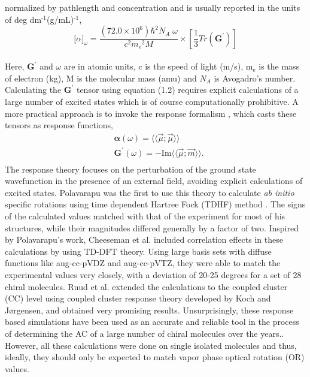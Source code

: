 normalized by pathlength and concentration and is usually reported in the units of deg dm$^{\text{-1}}$(g/mL)$^{\text{-1}}$,\cite{Crawford06}
\\
\begin{equation}
{\lbrack\alpha\rbrack}_{\omega} = \frac{(72.0 \times 10^6){\hbar}^2 N_A\;\omega}{c^2{m_e}^2 M} \times \left[ \frac{1}{3}Tr(\textbf{G}^\prime)\right]
\end{equation}
\\
Here, $\textbf{G}^\prime$ and $\omega$ are in atomic units, c is the speed of light (m/s), m$_{\text{e}}$ is the 
mass of electron (kg), M is the molecular mass (amu) and $N_A$ is Avogadro's number. Calculating the 
$\textbf{G}^\prime$ tensor using equation (1.2) requires explicit calculations of a large number of 
excited states which is of course computationally prohibitive. A more practical approach is to invoke the response formalism
\cite{Koch90,Kobayashi94}, which casts these tensors as response functions,
\begin{equation}
\begin{split}
&\bm{\alpha}(\omega) = \langle\langle\vec{\mu};\vec{\mu}\rangle\rangle\\
&\textbf{G}^{\prime}(\omega) = -\text{Im}\langle\langle\vec{\mu};\vec{m}\rangle\rangle.\\
\end{split}
\end{equation} 
The response theory focuses on the perturbation of the ground state wavefunction in the presence of an external 
field, avoiding explicit calculations of excited states. Polavarapu was the first to use this theory to calculate 
{\em ab initio} specific rotations using time dependent Hartree Fock (TDHF) method \cite{Polavarapu96}. 
The signs of the calculated values matched with that of the experiment for most of his structures, while their magnitudes 
differed generally by a factor of two. Inspired by Polavarapu's work, Cheeseman et al. \cite{Cheeseman00,Stephens01} 
included correlation effects in these calculations by using TD-DFT theory. Using large basis sets with diffuse functions like 
aug-cc-pVDZ and aug-cc-pVTZ,\cite{Dunning89,Kendall92,Woon94} they were able to match the experimental values very closely, with a 
deviation of 20-25 degrees for a set of 28 chiral molecules. Ruud et al. extended the calculations to the coupled cluster (CC)
level using coupled cluster response theory developed by Koch and J{\o}rgensen\cite{Koch90}, and obtained very 
promising results\cite{Ruud03}. Unsurprisingly, these response based simulations have been used as an accurate and 
reliable tool in the process of determining the AC of a large number of chiral molecules over the years.\cite{Kondru99}. 
However, all these calculations were done on single isolated molecules and thus, ideally, they should only be 
expected to match vapor phase optical rotation (OR) values. 

